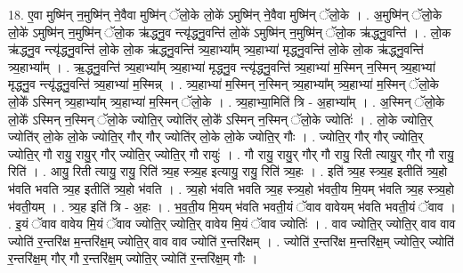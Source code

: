 \documentclass[17pt]{extarticle}
\begin{document}
18. ए॒वा मुष्मि॑न् न॒मुष्मि॑न् ने॒वैवा मुष्मि॑न् ॅलो॒के लो॒के॑ ऽमुष्मि॑न् ने॒वैवा मुष्मि॑न् ॅलो॒के । . अ॒मुष्मि॑न् ॅलो॒के लो॒के॑ ऽमुष्मि॑न् न॒मुष्मि॑न् ॅलो॒क ऋ॑द्ध्नु॒व न्त्यृ॑द्ध्नु॒वन्ति॑ लो॒के॑ ऽमुष्मि॑न् न॒मुष्मि॑न् ॅलो॒क ऋ॑द्ध्नु॒वन्ति॑ । . लो॒क ऋ॑द्ध्नु॒व न्त्यृ॑द्ध्नु॒वन्ति॑ लो॒के लो॒क ऋ॑द्ध्नु॒वन्ति॑ त्र्य॒हाभ्या᳚म् त्र्य॒हाभ्या॑ मृद्ध्नु॒वन्ति॑ लो॒के लो॒क ऋ॑द्ध्नु॒वन्ति॑ त्र्य॒हाभ्या᳚म् । . ऋ॒द्ध्नु॒वन्ति॑ त्र्य॒हाभ्या᳚म् त्र्य॒हाभ्या॑ मृद्ध्नु॒व न्त्यृ॑द्ध्नु॒वन्ति॑ त्र्य॒हाभ्या॑ म॒स्मिन् न॒स्मिन् त्र्य॒हाभ्या॑ मृद्ध्नु॒व न्त्यृ॑द्ध्नु॒वन्ति॑ त्र्य॒हाभ्या॑ म॒स्मिन्न् । . त्र्य॒हाभ्या॑ म॒स्मिन् न॒स्मिन् त्र्य॒हाभ्या᳚म् त्र्य॒हाभ्या॑ म॒स्मिन् ॅलो॒के लो॒के᳚ ऽस्मिन् त्र्य॒हाभ्या᳚म् त्र्य॒हाभ्या॑ म॒स्मिन् ॅलो॒के । . त्र्य॒हाभ्या॒मिति॑ त्रि - अ॒हाभ्या᳚म् । . अ॒स्मिन् ॅलो॒के लो॒के᳚ ऽस्मिन् न॒स्मिन् ॅलो॒के ज्योति॒र् ज्योति॑र् लो॒के᳚ ऽस्मिन् न॒स्मिन् ॅलो॒के ज्योतिः॑ । . लो॒के ज्योति॒र् ज्योति॑र् लो॒के लो॒के ज्योति॒र् गौर् गौर् ज्योति॑र् लो॒के लो॒के ज्योति॒र् गौः । . ज्योति॒र् गौर् गौर् ज्योति॒र् ज्योति॒र् गौ रायु॒ रायु॒र् गौर् ज्योति॒र् ज्योति॒र् गौ रायुः॑ । . गौ रायु॒ रायु॒र् गौर् गौ रायु॒ रिती त्यायु॒र् गौर् गौ रायु॒ रिति॑ । . आयु॒ रिती त्यायु॒ रायु॒ रिति॑ त्र्य॒ह स्त्र्य॒ह इत्यायु॒ रायु॒ रिति॑ त्र्य॒हः । . इति॑ त्र्य॒ह स्त्र्य॒ह इतीति॑ त्र्य॒हो भ॑वति भवति त्र्य॒ह इतीति॑ त्र्य॒हो भ॑वति । . त्र्य॒हो भ॑वति भवति त्र्य॒ह स्त्र्य॒हो भ॑वती॒य मि॒यम् भ॑वति त्र्य॒ह स्त्र्य॒हो भ॑वती॒यम् । . त्र्य॒ह इति॑ त्रि - अ॒हः । . भ॒व॒ती॒य मि॒यम् भ॑वति भवती॒यं ॅवाव वावेयम् भ॑वति भवती॒यं ॅवाव । . इ॒यं ॅवाव वावेय मि॒यं ॅवाव ज्योति॒र् ज्योति॒र् वावेय मि॒यं ॅवाव ज्योतिः॑ । . वाव ज्योति॒र् ज्योति॒र् वाव वाव ज्योति॑ र॒न्तरि॑क्ष म॒न्तरि॑क्ष॒म् ज्योति॒र् वाव वाव ज्योति॑ र॒न्तरि॑क्षम् । . ज्योति॑ र॒न्तरि॑क्ष म॒न्तरि॑क्ष॒म् ज्योति॒र् ज्योति॑ र॒न्तरि॑क्ष॒म् गौर् गौ र॒न्तरि॑क्ष॒म् ज्योति॒र् ज्योति॑ र॒न्तरि॑क्ष॒म् गौः । \newline
\end{document}
